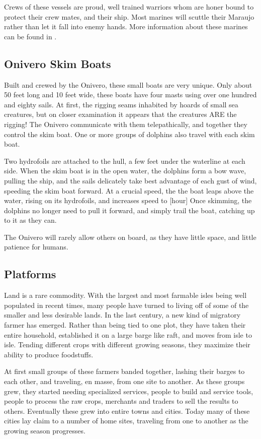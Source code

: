 Crews of these vessels are proud, well trained warriors whom are honer bound to protect their crew mates, and their ship. Most marines will scuttle their Maraujo rather than let it fall into enemy hands. More information about these marines can be found in .
\subsection{Onivero Skim Boats}
Built and crewed by the Onivero, these small boats are very unique. Only about 50 feet long and 10 feet wide, these boats have four masts using over one hundred and eighty sails. At first, the rigging seams inhabited by hoards of small sea creatures, but on closer examination it appears that the creatures ARE the rigging! The Onivero communicate with them telepathically, and together they control the skim boat. One or more groups of dolphins also travel with each skim boat.

Two hydrofoils are attached to the hull, a few feet under the waterline at each side. When the skim boat is in the open water, the dolphins form a bow wave, pulling the ship,
and the sails delicately take best advantage of each gust of wind, speeding the skim boat forward. At a crucial speed, the the boat leaps above the water, rising on its hydrofoils, and increases speed to [hour] Once skimming, the dolphins no longer need to pull it forward, and simply trail the boat, catching up to it as they can.

The Onivero will rarely allow others on board, as they have little space, and little patience for humans.
\subsection{Platforms}
Land is a rare commodity. With the largest and most farmable isles being well populated in recent times, many people have turned to living off of some of the smaller
and less desirable lands. In the last century, a new kind of migratory farmer has emerged. Rather than being tied to one plot, they have taken their entire household, established it on a large barge like raft, and moves from isle to isle. Tending different crops with different growing seasons, they maximize their ability to produce foodstuffs.

At first small groups of these farmers banded together, lashing their barges to each other, and traveling, en masse, from one site to another. As these groups grew, they
started needing specialized services, people to build and service tools, people to process the raw crops, merchants and traders to sell the results to others. Eventually these grew into entire towns and cities. Today many of these cities lay claim to a number of home sites, traveling from one to another as the growing season progresses.
